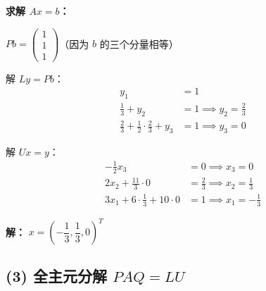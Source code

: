 \documentclass{article}
\begin{document}
\begin{solution}
  \textbf{求解 $Ax = b$：}

  $Pb =
  \begin{pmatrix}1\\1\\1
  \end{pmatrix}$（因为 $b$ 的三个分量相等）

  解 $Ly = Pb$：
  \begin{align*}
    y_1 &= 1 \\
    \frac{1}{3} + y_2 &= 1 \implies y_2 = \frac{2}{3} \\
    \frac{2}{3} + \frac{1}{2} \cdot \frac{2}{3} + y_3 &= 1 \implies y_3 = 0
  \end{align*}

  解 $Ux = y$：
  \begin{align*}
    -\frac{1}{2}x_3 &= 0 \implies x_3 = 0 \\
    2x_2 + \frac{11}{3} \cdot 0 &= \frac{2}{3} \implies x_2 = \frac{1}{3} \\
    3x_1 + 6 \cdot \frac{1}{3} + 10 \cdot 0 &= 1 \implies x_1 = -\frac{1}{3}
  \end{align*}

  \textbf{解：} $\boxed{x = \left(-\dfrac{1}{3}, \dfrac{1}{3}, 0\right)^T}$
\end{solution}

\subsection*{(3) 全主元分解 $PAQ = LU$}
\end{document}
